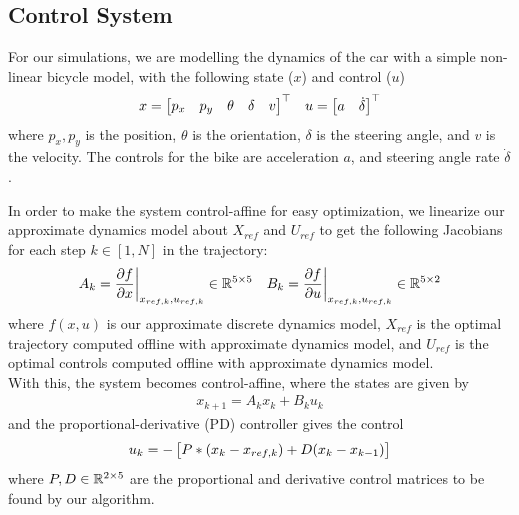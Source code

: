 \documentclass[11pt]{article}
\begin{document}
    \subsection{Control System} \label{sec:prob:control}
    For our simulations, we are modelling the dynamics of the car with a simple non-linear bicycle model, with the following state ($x$) and control ($u$)
    \begin{align*} 
        x = {\begin{bmatrix}p_x & p_y & \theta & \delta & v\end{bmatrix}}^{\top} &&
        u = {\begin{bmatrix}a & \dot{\delta}\end{bmatrix}}^{\top}
    \end{align*}
    where $p_x, p_y$ is the position, $\theta$ is the orientation, $\delta$ is the steering angle, and $v$ is the velocity. The controls for the bike are acceleration $a$, and steering angle rate $\dot{\delta}$.
    
    In order to make the system control-affine for easy optimization, we linearize our approximate dynamics model about $X_{ref}$ and $U_{ref}$ to get the following Jacobians for each step $k \in [1, N] $ in the trajectory:
    \begin{align*}
        A_k = \frac{\partial f}{\partial x}\bigg|_{x_{ref,k},u_{ref,k}} \in \mathbb R^{5\times 5}&& 
        B_k = \frac{\partial f}{\partial u}\bigg|_{x_{ref,k},u_{ref,k}}  \in \mathbb R^{5\times 2}
    \end{align*}
    where $f(x,u)$ is our approximate discrete dynamics model, $X_{ref}$ is the optimal trajectory computed offline with approximate dynamics model, and $U_{ref}$ is the optimal controls computed offline with approximate dynamics model. \\
    With this, the system becomes control-affine, where the states are given by
    \begin{align*}
        x_{k+1} = A_k x_k + B_k u_k
    \end{align*}
    and the proportional-derivative (PD) controller gives the control
    \begin{align*}
        u_k = - \left[\strut P * \left(x_{k} - x_{ref,k}\right) + D (x_k - x_{k-1}) \strut \right]
    \end{align*}
    where $P,D \in \mathbb R^{2\times 5}$ are the proportional and derivative control matrices to be found by our algorithm.
    
\end{document}
